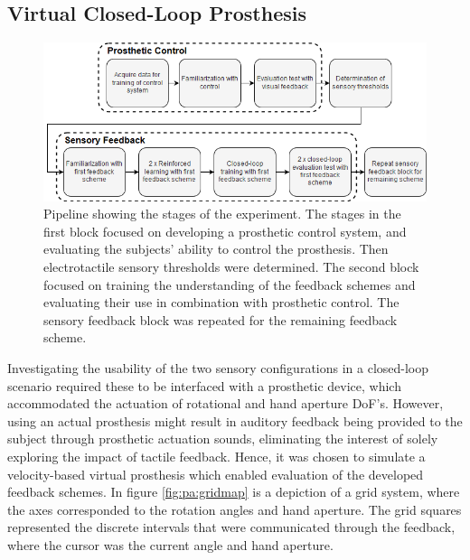 
\subsection{Virtual Closed-Loop Prosthesis}
 \begin{figure}[h]
		\includegraphics[width=.85\textwidth]{figures/std_paper}
	\caption{Pipeline showing the stages of the experiment. The stages in the first block focused on developing a prosthetic control system, and evaluating the subjects' ability to control the prosthesis. Then electrotactile sensory thresholds were determined. The second block focused on training the understanding of the feedback schemes and evaluating their use in combination with prosthetic control. The sensory feedback block was repeated for the remaining feedback scheme.}
	\label{fig:pa:std_pap} 
\end{figure}
Investigating the usability of the two sensory configurations in a closed-loop scenario required these to be interfaced with a prosthetic device, which accommodated the actuation of rotational and hand aperture DoF's. However, using an actual prosthesis might result in auditory feedback being provided to the subject through prosthetic actuation sounds, eliminating the interest of solely exploring the impact of tactile feedback. Hence, it was chosen to simulate a velocity-based virtual prosthesis which enabled evaluation of the developed feedback schemes. In figure \ref{fig:pa:gridmap} is a depiction of a grid system, where the axes corresponded to the rotation angles and hand aperture. The grid squares represented the discrete intervals that were communicated through the feedback, where the cursor was the current angle and hand aperture. 
